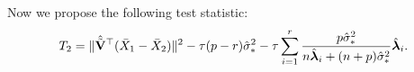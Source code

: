 \documentclass[times,sort&compress,3p]{elsarticle}
\newcommand{\bfsym}[1]{\ensuremath{\boldsymbol{#1}}}
\def\blambda {\bfsym {\lambda}}        \def\bLambda {\bfsym {\Lambda}}
\theoremstyle{plain}
\theoremstyle{definition}
\theoremstyle{remark}
\begin{document}

Now we propose the following test statistic:
$$
T_2=
\|\hat{\tilde{\BV}}^\top  (\bar{X}_1-\bar{X}_2)\|^2
-
\tau(p-r)\hat{\sigma}_*^2 
- \tau\sum_{i=1}^r \frac{p\hat{\sigma}_*^2}{n\hat{\blambda}_i+(n+p)\hat{\sigma}_*^2}\hat{\blambda}_i.
$$
\end{document}
